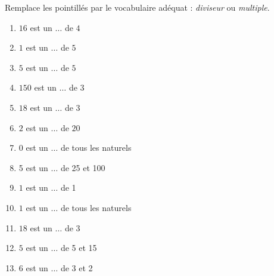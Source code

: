%
%
	Remplace les pointillés par le vocabulaire adéquat : \textit{diviseur} ou \textit{multiple}.
	\begin{enumerate}[cols=3]
		\item $16$ est un $\ldots$ de $4$
		\item $1$ est un $\ldots$ de $5$
		\item $5$ est un $\ldots$ de $5$
		\item $150$ est un $\ldots$ de $3$
		\item $18$ est un $\ldots$ de $3$
		\item $2$ est un $\ldots$ de $20$
		\item $0$ est un $\ldots$ de  tous les naturels
		\item 5 est un $\ldots$ de 25 et 100
		\item $1$ est un $\ldots$ de 1
		\item $1$ est un $\ldots$ de tous les naturels
		\item $ 18$ est un $\ldots$ de $3$
		\item $5$ est un $\ldots$ de 5 et 15
		\item $6$ est un $\ldots$ de 3 et 2
		
	\end{enumerate}

